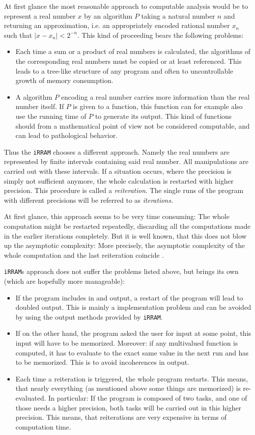 \documentclass{article}
\newcommand{\irram}{\texttt{iRRAM}\xspace}
\newcommand{\irrams}{\texttt{iRRAM}s\xspace}
\begin{document}
At first glance the most reasonable approach to computable analysis would be to represent a real number $x$ by an algorithm $P$ taking a natural number $n$ and returning an approximation, i.e. an appropriately encoded rational number $x_n$ such that $|x-x_n|<2^{-n}$. This kind of proceeding bears the following problems:
\begin{itemize}
\item Each time a sum or a product of real numbers is calculated, the algorithms of the corresponding real numbers must be copied or at least referenced. This leads to a tree-like structure of any program and often to uncontrollable growth of memory consumption.
\item A algorithm $P$ encoding a real number carries more information than the real number itself. If $P$ is given to a function, this function can for example also use the running time of $P$ to generate its output. This kind of functions should from a mathematical point of view not be considered computable, and can lead to pathological behavior.
\end{itemize}

Thus the \irram chooses a different approach. Namely the real numbers are represented by finite intervals containing said real number. All manipulations are carried out with these intervals. If a situation occurs, where the precision is simply not sufficient anymore, the whole calculation is restarted with higher precision. This procedure is called a \emph{reiteration}. The single runs of the program with different precisions will be referred to as \emph{iterations}.

At first glance, this approach seems to be very time consuming: The whole computation might be restarted repeatedly, discarding all the computations made in the earlier iterations completely. But it is well known, that this does not blow up the asymptotic complexity: More precisely, the asymptotic complexity of the whole computation and the last reiteration coincide \cite{}.

\irrams approach does not suffer the problems listed above, but brings its own (which are hopefully more manageable):
\begin{itemize}
\item If the program includes in and output, a restart of the program will lead to doubled output. This is mainly a implementation problem and can be avoided by using the output methods provided by \irram.
\item If on the other hand, the program asked the user for input at some point, this input will have to be memorized. Moreover: if any multivalued function is computed, it has to evaluate to the exact same value in the next run and has to be memorized. This is to avoid incoherences in output.
\item Each time a reiteration is triggered, the whole program restarts. This means, that nearly everything (as mentioned above some things are memorized) is re-evaluated. In particular: If the program is composed of two tasks, and one of those needs a higher precision, both tasks will be carried out in this higher precision. This means, that reiterations are very expensive in terms of computation time.
\end{itemize}
\end{document}
